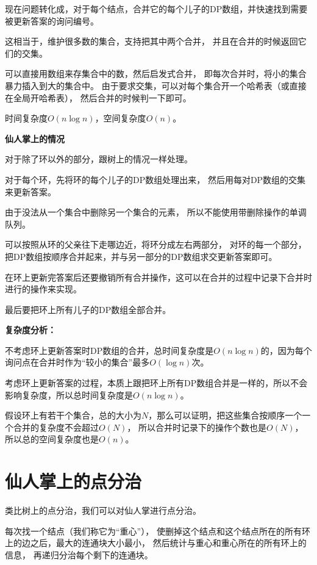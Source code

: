 \documentclass{noithesis}
\begin{document}
现在问题转化成，对于每个结点，合并它的每个儿子的DP数组，并快速找到需要被更新答案的询问编号。

这相当于，维护很多数的集合，支持把其中两个合并，
并且在合并的时候返回它们的交集。

可以直接用数组来存集合中的数，然后启发式合并，
即每次合并时，将小的集合暴力插入到大的集合中。
由于要求交集，可以对每个集合开一个哈希表（或直接在全局开哈希表），
然后合并的时候判一下即可。

时间复杂度$O(n \log n)$，空间复杂度$O(n)$。

\text{}

\textbf{仙人掌上的情况}

对于除了环以外的部分，跟树上的情况一样处理。

对于每个环，先将环的每个儿子的DP数组处理出来，
然后用每对DP数组的交集来更新答案。

由于没法从一个集合中删除另一个集合的元素，
所以不能使用带删除操作的单调队列。

可以按照从环的父亲往下走哪边近，将环分成左右两部分，
对环的每一个部分，把DP数组按顺序合并起来，并与另一部分的DP数组求交更新答案即可。

在环上更新完答案后还要撤销所有合并操作，这可以在合并的过程中记录下合并时进行的操作来实现。

最后要把环上所有儿子的DP数组全部合并。

\text{}

\textbf{复杂度分析：}

不考虑环上更新答案时DP数组的合并，总时间复杂度是$O(n \log n)$的，因为每个询问点在合并时作为``较小的集合''最多$O(\log n)$次。

考虑环上更新答案的过程，本质上跟把环上所有DP数组合并是一样的，所以不会影响复杂度，所以总时间复杂度是$O(n \log n)$。

假设环上有若干个集合，总的大小为$N$，那么可以证明，把这些集合按顺序一个一个合并的复杂度不会超过$O(N)$，
所以合并时记录下的操作个数也是$O(N)$，
所以总的空间复杂度也是$O(n)$。

\text{}

\section{仙人掌上的点分治}

类比树上的点分治，我们可以对仙人掌进行点分治。

每次找一个结点（我们称它为``重心''），
使删掉这个结点和这个结点所在的所有环上的边之后，最大的连通块大小最小，
然后统计与重心和重心所在的所有环上的信息，
再递归分治每个剩下的连通块。
\end{document}
